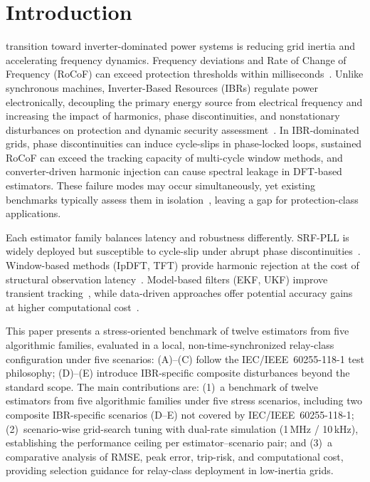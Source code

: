 \section{Introduction}\label{sec:introduction}

 transition toward inverter-dominated power systems is
reducing grid inertia and accelerating frequency dynamics. Frequency
deviations and Rate of Change of Frequency (RoCoF) can exceed protection
thresholds within milliseconds~\cite{Pinheiro2025,WeakGrids2023}. Unlike
synchronous machines, Inverter-Based Resources (IBRs) regulate power
electronically, decoupling the primary energy source from electrical
frequency and increasing the impact of harmonics, phase discontinuities,
and nonstationary disturbances on protection and dynamic security
assessment~\cite{Bernal2024,Zoghby2024,Pinheiro2025}. In IBR-dominated
grids, phase discontinuities can induce cycle-slips in phase-locked loops,
sustained RoCoF can exceed the tracking capacity of multi-cycle window
methods, and converter-driven harmonic injection can cause spectral leakage
in DFT-based estimators. These failure modes may occur simultaneously, yet
existing benchmarks typically assess them in isolation~\cite{Ting2022},
leaving a gap for protection-class applications.

Each estimator family balances latency and robustness differently.
SRF-PLL is widely deployed but susceptible to cycle-slip under abrupt
phase discontinuities~\cite{EPRIPaper,Roscoe2019}. Window-based methods
(IpDFT, TFT) provide harmonic rejection at the cost of structural
observation latency~\cite{Belega2014,PlatasGarza2011}. Model-based filters
(EKF, UKF) improve transient tracking~\cite{Ferrero2020EKF,Chamorro2021},
while data-driven approaches offer potential accuracy gains at higher
computational cost~\cite{Ting2022,Zelaya2025}.

This paper presents a stress-oriented benchmark of twelve estimators from
five algorithmic families, evaluated in a local, non-time-synchronized
relay-class configuration under five scenarios: (A)--(C) follow the
IEC/IEEE~60255-118-1 test philosophy; (D)--(E) introduce IBR-specific
composite disturbances beyond the standard scope. The main contributions are:
(1)~a benchmark of twelve estimators from five algorithmic families under
five stress scenarios, including two composite IBR-specific scenarios
(D--E) not covered by IEC/IEEE~60255-118-1;
(2)~scenario-wise grid-search tuning with dual-rate simulation
(1\,MHz / 10\,kHz), establishing the performance ceiling per
estimator--scenario pair; and
(3)~a comparative analysis of RMSE, peak error, trip-risk, and
computational cost, providing selection guidance for relay-class
deployment in low-inertia grids.